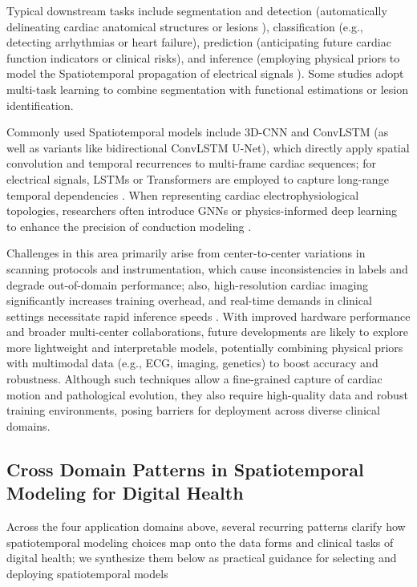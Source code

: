 \documentclass[acmsmall]{acmart}
\begin{document}
Typical downstream tasks include segmentation and detection (automatically delineating cardiac anatomical structures or lesions \cite{6,7,8}), classification (e.g., detecting arrhythmias or heart failure), prediction (anticipating future cardiac function indicators or clinical risks), and inference (employing physical priors to model the Spatiotemporal propagation of electrical signals \cite{8}). Some studies adopt multi-task learning to combine segmentation with functional estimations or lesion identification.

Commonly used Spatiotemporal models include 3D-CNN and ConvLSTM (as well as variants like bidirectional ConvLSTM U-Net), which directly apply spatial convolution and temporal recurrences to multi-frame cardiac sequences; for electrical signals, LSTMs or Transformers are employed to capture long-range temporal dependencies \cite{6,7}. When representing cardiac electrophysiological topologies, researchers often introduce GNNs or physics-informed deep learning to enhance the precision of conduction modeling \cite{8}.

Challenges in this area primarily arise from center-to-center variations in scanning protocols and instrumentation, which cause inconsistencies in labels and degrade out-of-domain performance; also, high-resolution cardiac imaging significantly increases training overhead, and real-time demands in clinical settings necessitate rapid inference speeds \cite{7}. With improved hardware performance and broader multi-center collaborations, future developments are likely to explore more lightweight and interpretable models, potentially combining physical priors with multimodal data (e.g., ECG, imaging, genetics) to boost accuracy and robustness. Although such techniques allow a fine-grained capture of cardiac motion and pathological evolution, they also require high-quality data and robust training environments, posing barriers for deployment across diverse clinical domains.

\subsection{Cross Domain Patterns in Spatiotemporal Modeling for Digital Health}
Across the four application domains above, several recurring patterns clarify how spatiotemporal modeling choices map onto the data forms and clinical tasks of digital health; we synthesize them below as practical guidance for selecting and deploying spatiotemporal models
\end{document}
